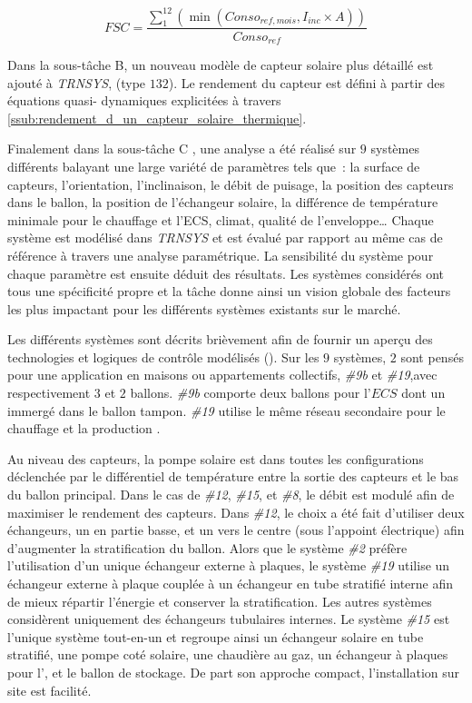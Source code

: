 \begin{equation}\label{eq:FSC}
        FSC = \frac{\sum_{1}^{12} \left( \min(Conso_{ref, mois}, I_{inc} \times A) \right)}{Conso_{ref}}
\end{equation}

Dans la sous-tâche B, un nouveau modèle de capteur solaire plus détaillé est ajouté à \textit{TRNSYS}, (type
$132$). Le rendement du capteur est défini à partir des équations quasi-
dynamiques explicitées à travers \ref{ssub:rendement_d_un_capteur_solaire_thermique}.

Finalement dans la sous-tâche C \parencite{Task26C2007}, une analyse a été réalisé sur
$9$ systèmes différents balayant une large variété de
paramètres tels que~: la surface de capteurs, l’orientation, l’inclinaison, le débit de puisage,
la position des capteurs dans le ballon, la position de l’échangeur solaire, la différence de
température minimale pour le chauffage et l’ECS, climat, qualité de l’enveloppe\dots
Chaque système est modélisé dans \textit{TRNSYS} et est évalué par
rapport au même cas de référence à travers une analyse paramétrique. La sensibilité du
système pour chaque paramètre est ensuite déduit des résultats. Les systèmes
considérés ont tous une spécificité propre et la tâche donne ainsi un vision globale des
facteurs les plus impactant pour les différents systèmes existants sur le marché.

Les différents systèmes sont décrits brièvement afin de fournir un aperçu des
technologies et logiques de contrôle modélisés ().
Sur les $9$ systèmes, $2$ sont pensés pour une application en maisons ou appartements
collectifs, \emph{\#9b} et \emph{\#19},avec respectivement $3$ et $2$ ballons.
\emph{\#9b} comporte deux ballons pour l’$ECS$ dont un immergé
dans le ballon tampon. \emph{\#19} utilise le même réseau secondaire pour le chauffage
et la production .

Au niveau des capteurs, la pompe solaire est dans toutes les configurations déclenchée
par le différentiel de température entre la sortie des capteurs et le bas du ballon
principal. Dans le cas de \emph{\#12}, \emph{\#15}, et \emph{\#8}, le débit est
modulé afin de maximiser le rendement des capteurs. Dans \emph{\#12}, le choix a été
fait d’utiliser deux échangeurs, un en partie basse, et un vers le centre (sous l’appoint
électrique) afin d’augmenter la stratification du ballon.
Alors que le système \emph{\#2} préfère l’utilisation d’un unique échangeur externe
à plaques, le système \emph{\#19} utilise un échangeur externe à plaque couplée
à un échangeur en tube stratifié interne afin de mieux répartir l’énergie et conserver
la stratification. Les autres systèmes considèrent uniquement
des échangeurs tubulaires internes.
Le système \emph{\#15} est l’unique système tout-en-un et regroupe ainsi
un échangeur solaire en tube stratifié, une pompe coté solaire,
une chaudière au gaz, un échangeur à plaques pour l’, et le ballon de stockage.
De part son approche compact, l’installation sur site est facilité.

